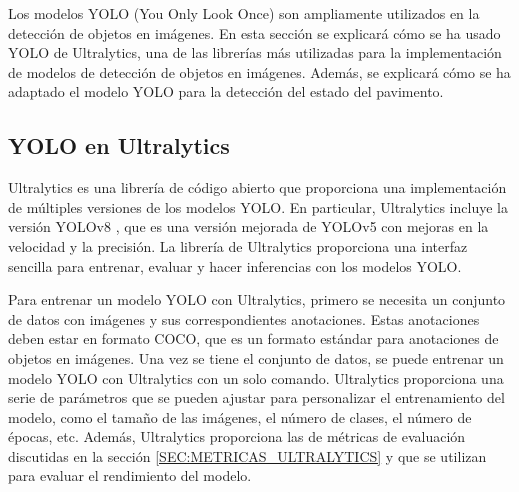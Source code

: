 Los modelos YOLO (You Only Look Once) son ampliamente utilizados en la detección de objetos en imágenes. En esta sección se explicará cómo se ha usado YOLO de Ultralytics, una de las librerías más utilizadas para la implementación de modelos de detección de objetos en imágenes. Además, se explicará cómo se ha adaptado el modelo YOLO para la detección del estado del pavimento.

\subsection{YOLO en Ultralytics}
Ultralytics es una librería de código abierto que proporciona una implementación de múltiples versiones de los modelos YOLO. En particular, Ultralytics incluye la versión YOLOv8 \cite{yolov8_ultralytics}, que es una versión mejorada de YOLOv5 con mejoras en la velocidad y la precisión. La librería de Ultralytics proporciona una interfaz sencilla para entrenar, evaluar y hacer inferencias con los modelos YOLO.

Para entrenar un modelo YOLO con Ultralytics, primero se necesita un conjunto de datos con imágenes y sus correspondientes anotaciones. Estas anotaciones deben estar en formato COCO, que es un formato estándar para anotaciones de objetos en imágenes. Una vez se tiene el conjunto de datos, se puede entrenar un modelo YOLO con Ultralytics con un solo comando. Ultralytics proporciona una serie de parámetros que se pueden ajustar para personalizar el entrenamiento del modelo, como el tamaño de las imágenes, el número de clases, el número de épocas, etc. Además, Ultralytics proporciona las de métricas de evaluación discutidas en la sección \ref{SEC:METRICAS_ULTRALYTICS} y que se utilizan para evaluar el rendimiento del modelo.
